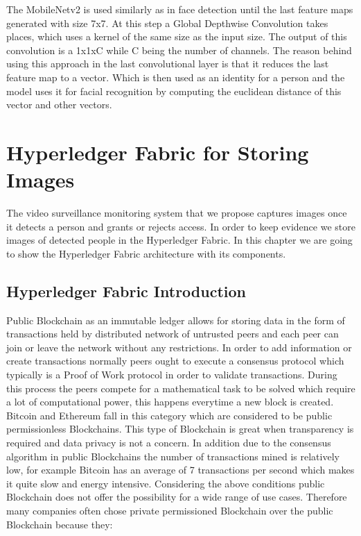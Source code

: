 The MobileNetv2 is used similarly as in face detection until the last feature maps generated with size 7x7. At this step a Global Depthwise Convolution takes places, which uses a kernel of the same size as the input size. The output of this convolution is a 1x1xC while C being the number of channels. The reason behind using this approach in the last convolutional layer is that it reduces the last feature map to a vector. Which is then used as an identity for a person and the model uses it for facial recognition by computing the euclidean distance of this vector and other vectors. 



\chapter{Hyperledger Fabric for Storing Images}


 The video surveillance monitoring system that we propose captures images once it detects a person and grants or rejects access. In order to keep evidence we store images of detected people in the Hyperledger Fabric. 
 In this chapter we are going to show the Hyperledger Fabric architecture with its components. 


\section{Hyperledger Fabric Introduction}
Public Blockchain as an immutable ledger allows for storing data in the form of transactions held by distributed network of untrusted peers and each peer can join or leave the network without any restrictions. In order to add information or create transactions normally peers ought to execute a consensus protocol which typically is a Proof of Work protocol in order to validate transactions. During this process  the peers compete for a mathematical task to be solved which require a lot of computational power, this happens everytime a new block is created. Bitcoin and Ethereum fall in this category which are considered to be public permissionless Blockchains. This type of Blockchain is great when transparency is required and data privacy is not a concern. 
In addition due to the consensus algorithm in public Blockchains the number of transactions mined is relatively low, for example Bitcoin has an average of 7 transactions per second which makes it quite slow and energy intensive. Considering the above conditions public Blockchain does not offer the possibility for a wide range of use cases. Therefore many companies often chose private permissioned Blockchain over the public Blockchain because they: 

